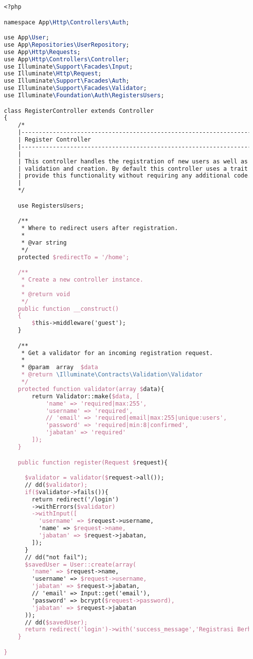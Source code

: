 \begin{lstlisting}[language=tex,basicstyle=\tiny,caption=RegisterController.php]
<?php

namespace App\Http\Controllers\Auth;

use App\User;
use App\Repositories\UserRepository;
use App\Http\Requests;
use App\Http\Controllers\Controller;
use Illuminate\Support\Facades\Input;
use Illuminate\Http\Request;
use Illuminate\Support\Facades\Auth;
use Illuminate\Support\Facades\Validator;
use Illuminate\Foundation\Auth\RegistersUsers;

class RegisterController extends Controller
{
    /*
    |--------------------------------------------------------------------------
    | Register Controller
    |--------------------------------------------------------------------------
    |
    | This controller handles the registration of new users as well as their
    | validation and creation. By default this controller uses a trait to
    | provide this functionality without requiring any additional code.
    |
    */

    use RegistersUsers;

    /**
     * Where to redirect users after registration.
     *
     * @var string
     */
    protected $redirectTo = '/home';

    /**
     * Create a new controller instance.
     *
     * @return void
     */
    public function __construct()
    {
        $this->middleware('guest');
    }

    /**
     * Get a validator for an incoming registration request.
     *
     * @param  array  $data
     * @return \Illuminate\Contracts\Validation\Validator
     */
    protected function validator(array $data){
        return Validator::make($data, [
            'name' => 'required|max:255',
            'username' => 'required',
            // 'email' => 'required|email|max:255|unique:users',
            'password' => 'required|min:8|confirmed',
            'jabatan' => 'required'
        ]);
    }

    public function register(Request $request){

      $validator = validator($request->all());
      // dd($validator);
      if($validator->fails()){
        return redirect('/login')
        ->withErrors($validator)
        ->withInput([
          'username' => $request->username,
          'name' => $request->name,
          'jabatan' => $request->jabatan,
        ]);
      }
      // dd("not fail");
      $savedUser = User::create(array(
        'name' => $request->name,
        'username' => $request->username,
        'jabatan' => $request->jabatan,
        // 'email' => Input::get('email'),
        'password' => bcrypt($request->password),
        'jabatan' => $request->jabatan
      ));
      // dd($savedUser);
      return redirect('login')->with('success_message','Registrasi Berhasil');
    }

}
\end{lstlisting}

